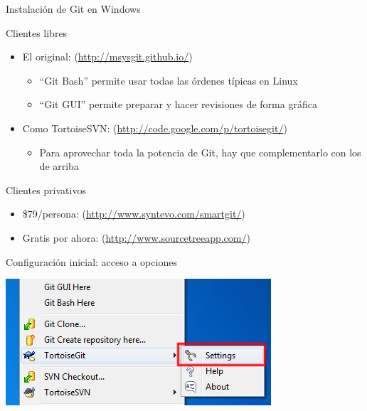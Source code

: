\documentclass[xcolor=svgnames]{beamer}
\begin{document}
\begin{frame}{Instalación de Git en Windows}
  \begin{block}{Clientes libres}
    \begin{itemize}
    \item El original:  (\url{http://msysgit.github.io/})
      \begin{itemize}
      \item ``Git Bash'' permite usar todas las órdenes típicas en Linux
      \item ``Git GUI'' permite preparar y hacer revisiones de forma gráfica
      \end{itemize}
    \item Como TortoiseSVN:  (\url{http://code.google.com/p/tortoisegit/})
      \begin{itemize}
      \item Para aprovechar toda la potencia de Git, hay que complementarlo con los de arriba
      \end{itemize}
    \end{itemize}
  \end{block}

  \begin{block}{Clientes privativos}
    \begin{itemize}
    \item \$79/persona:  (\url{http://www.syntevo.com/smartgit/})
    \item Gratis por ahora:  (\url{http://www.sourcetreeapp.com/})
    \end{itemize}
  \end{block}
\end{frame}

\begin{frame}{Configuración inicial: acceso a opciones}
  \begin{center}
    \includegraphics[width=\textwidth,height=.8\textheight,keepaspectratio]{tomas/configinicial-00-menu}
  \end{center}
\end{frame}
\end{document}
